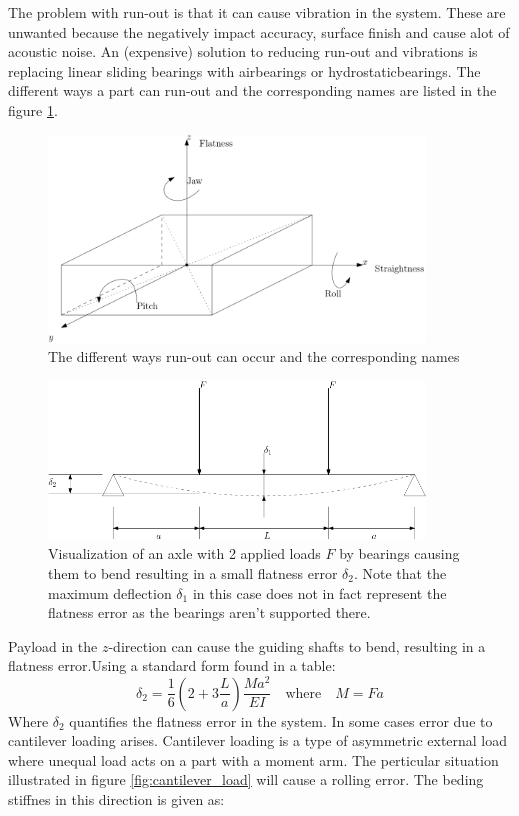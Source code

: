 \documentclass[11pt, a4paper]{article}
\numberwithin{equation}{section}
\numberwithin{figure}{section}
\begin{document}
The problem with run-out is that it can cause vibration in the system. These are unwanted because the negatively impact accuracy, surface finish and cause alot of acoustic noise. An (expensive) solution to reducing run-out and vibrations is replacing linear sliding bearings with airbearings or hydrostaticbearings. The different ways a part can run-out and the corresponding names are listed in the figure \ref{fig:run_out}.
\begin{figure}[H]
  \centerline{\includegraphics[width=100mm]{images/Run_out.png}}
  \caption{The different ways run-out can occur and the corresponding names}
  \label{fig:run_out}
\end{figure}
\begin{figure}[H]
  \centerline{\includegraphics[width=100mm]{images/Loaded_Axle.png}}
  \caption{Visualization of an axle with 2 applied loads $F$ by bearings causing them to bend resulting in a small flatness error $\delta_2$. Note that the maximum deflection $\delta_1$ in this case does not in fact represent the flatness error as the bearings aren't supported there.}
\end{figure}
Payload in the $z$-direction can cause the guiding shafts to bend, resulting in a flatness error.Using a standard form found in a table:
\begin{equation}
  \delta_2 = \frac{1}{6}\left(2 + 3\frac{L}{a} \right)\frac{Ma^2}{EI} \quad \text{where} \quad M = Fa
\end{equation}
Where $\delta_2$ quantifies the flatness error in the system.
In some cases error due to cantilever loading arises. Cantilever loading is a type of asymmetric external load where unequal load acts on a part with a moment arm. The perticular situation illustrated in figure \ref{fig:cantilever_load} will cause a rolling error. The beding stiffnes in this direction is given as:
\end{document}

